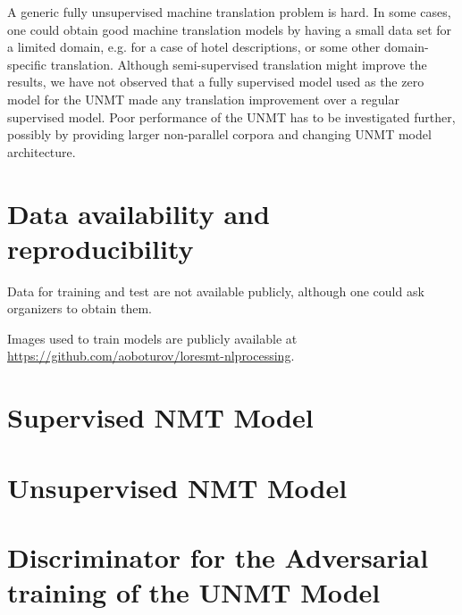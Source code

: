 \documentclass[]{article}
\begin{document}
A generic fully unsupervised machine translation problem is hard.
In some cases, one could obtain good machine translation models by having a small data set for a limited domain, e.g. for a case of hotel descriptions, or some other domain-specific translation.
Although semi-supervised translation might improve the results, we have not observed that a fully supervised model used as the zero model for the UNMT made any translation improvement over a regular supervised model.
Poor performance of the UNMT has to be investigated further, possibly by providing larger non-parallel corpora and changing UNMT model architecture.

\section{Data availability and reproducibility}
Data for training and test are not available publicly, although one could ask organizers to obtain them.

Images used to train models are publicly available at \url{https://github.com/aoboturov/loresmt-nlprocessing}.

\small




\begin{appendices}
\section{Supervised NMT Model}
\label{appendix:supervised}


\section{Unsupervised NMT Model}
\label{appendix:unsupervised}


\section{Discriminator for the Adversarial training of the UNMT Model}
\label{appendix:discriminator}


\end{appendices}
\end{document}
